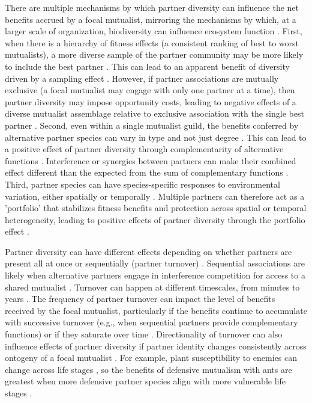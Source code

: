 \documentclass[11pt]{article}
\begin{document}
	There are multiple mechanisms by which partner diversity can influence the net benefits accrued by a focal mutualist, mirroring the mechanisms by which, at a larger scale of organization, biodiversity can influence ecosystem function \cite{Yeung2006,Barrett2015,Ushio2020}. 
	First, when there is a hierarchy of fitness effects (a consistent ranking of best to worst mutualists), a more diverse sample of the partner community may be more likely to include the best partner \cite{Frederickson2013}.
	This can lead to an apparent benefit of diversity driven by a sampling effect \cite{Batstone2018}. 
	However, if partner associations are mutually exclusive (a focal mutualist may engage with only one partner at a time), then partner diversity may impose opportunity costs, leading to negative effects of a diverse mutualist assemblage relative to exclusive association with the single best partner \citep{Miller2007}. 
	Second, even within a single mutualist guild, the benefits conferred by alternative partner species can vary in type and not just degree \cite{Stachowicz2005,Bronstein2006,Stanton2003}. 
	This can lead to a positive effect of partner diversity through complementarity of alternative functions \cite{Batstone2018}. 
	Interference or synergies between partners can make their combined effect different than the expected from the sum of complementary functions \cite{Afkhami2014}. 
	Third, partner species can have species-specific responses to environmental variation, either spatially \citep{Ollerton2006} or temporally \citep{Alarcon2008}. 
	Multiple partners can therefore act as a 'portfolio' that stabilizes fitness benefits and protection across spatial or temporal heterogeneity, leading to positive effects of partner diversity through the portfolio effect \cite{Batstone2018,Lazaro2022,Horvitz1990}. 
	
	Partner diversity can have different effects depending on whether partners are present all at once or sequentially (partner turnover) \citep{Djieto-Lordon2005, Ness2006, Bruna2014,Barrett2015,Ushio2020,Dattilo2014}. 
	Sequential associations are likely when alternative partners engage in interference competition for access to a shared mutualist \cite{Kiers2003,Batstone2018,Tgaard2015,Wulff2008}. 
	Turnover can happen at different timescales, from minutes to years \citep{Oliveira1999,Horvitz1986}. 
	The frequency of partner turnover can impact the level of benefits received by the focal mutualist, particularly if the benefits continue to accumulate with successive turnover (e.g., when sequential partners provide complementary functions) or if they saturate over time \citep{Sachs2004,Fiala1994}.
	Directionality of turnover can also influence effects of partner diversity if partner identity changes consistently across ontogeny of a focal mutualist \citep{Fonseca2003,Noe1994,Dejean2008}.
	For example, plant susceptibility to enemies can change across life stages \citep{Boege2005,Barton2010}, so the benefits of defensive mutualism with ants are greatest when more defensive partner species align with more vulnerable life stages \citep{Djieto-Lordon2005,Dejean2008}.
	
\end{document}
